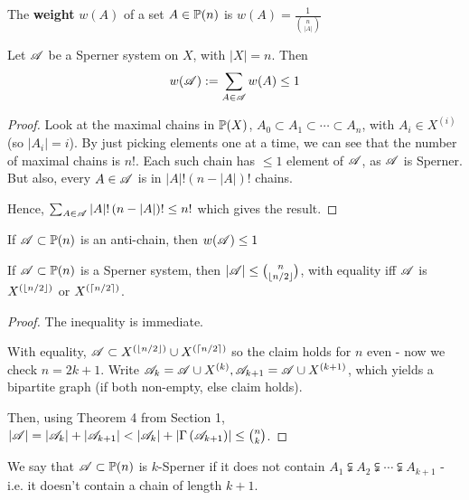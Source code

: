 \documentclass[a4paper]{article}
\begin{document}
\begin{defi}[Weight]
	The \textbf{weight} $w(A)$ of a set $A\in\P(n)$ is $w(A)=\frac{1}{\binom{n}{|A|}}$
\end{defi}

\begin{thm} 
	Let $\A$ be a Sperner system on $X$, with $|X|=n$. Then $$w(\A):=\sum_{A\in\A}w(A)\leq 1$$
\end{thm}
\begin{proof}
	Look at the maximal chains in $\P(X)$, $A_0\subset A_1\subset\cdots\subset A_n$, with $A_i\in X^{(i)}$ (so $|A_i|=i$). By just picking elements one at a time, we can see that the number of maximal chains is $n!$. Each such chain has $\leq 1$ element of $\A$, as $\A$ is Sperner. But also, every $A\in\A$ is in $|A|!\left(n-|A|\right)!$ chains.
	
	Hence, $\sum_{A\in\A}|A|!\left(n-|A|\right)!\leq n!$ which gives the result.
\end{proof}

\begin{thm}
	If $\A\subset \P(n)$ is an anti-chain, then $w(\A)\leq 1$
\end{thm}

\begin{cor}[3]
	If $\A\subset\P(n)$ is a Sperner system, then $|\A|\leq\binom{n}{\lf n/2\rf}$, with equality iff $\A$ is $X^{(\lf n/2\rf)}$ or $X^{(\lc n/2\rc)}$.
\end{cor}
\begin{proof}
	The inequality is immediate.
	
	With equality, $\A\subset X^{(\lf n/2\rf)}\cup X^{(\lc n/2\rc)}$ so the claim holds for $n$ even - now we check $n=2k+1$. Write $\A_k=\A\cup X^{(k)}, \A_{k+1}=\A\cup X^{(k+1)}$, which yields a bipartite graph (if both non-empty, else claim holds).
	
	Then, using Theorem 4 from Section 1, $|\A|=\left|\A_k\right|+\left|\A_{k+1}\right|<\left|\A_k\right|+\left|\Gamma\left(\A_{k+1}\right)\right|\leq\binom{n}{k}$.
\end{proof}

\begin{defi}[$k$-Sperner]
	We say that $\A\subset\P(n)$ is $k$-Sperner if it does not contain $A_1\subsetneqq A_2\subsetneqq \cdots\subsetneqq A_{k+1}$ - i.e. it doesn't contain a chain of length $k+1$.
\end{defi}
\end{document}
